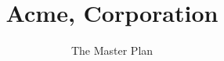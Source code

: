 \documentclass{article}[config]
\begin{document}
\title{Acme, Corporation}
\subtitle{The Master Plan}


\maketitle
















\end{document}
